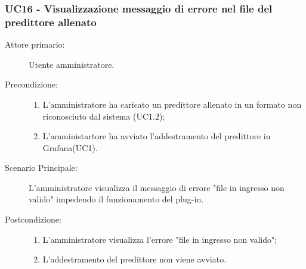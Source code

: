 \subsubsection{UC16 - Visualizzazione messaggio di errore nel file del predittore allenato}
\label{sssec:uc16}
\begin{description}
	\item[Attore primario:] Utente amministratore.
	\item[Precondizione:]
	\begin{enumerate}
		\item L'amministratore ha caricato un predittore allenato in un formato non riconosciuto dal sistema (UC1.2);
		\item L'amministartore ha avviato l'addestramento del predittore in Grafana(UC1).
	\end{enumerate}
	\item[Scenario Principale:] L'amministratore visualizza il messaggio di errore "file in ingresso non valido" impedendo il funzionamento del plug-in.
	\item[Postcondizione:]
	\begin{enumerate}
		\item L'amministratore visualizza l'errore "file in ingresso non valido";
		\item L'addestramento del predittore non viene avviato.
	\end{enumerate}
\end{description}